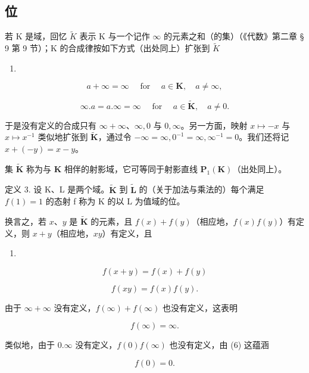 \subsection{位}

若 K 是域，回忆 \(\tilde{K}\) 表示 K 与一个记作 \(\infty\) 的元素之和（的集）（《代数》第二章 § 9 第 9 节）；K 的合成律按如下方式（出处同上）扩张到 \(\tilde{K}\)

\begin{enumerate}
\def\labelenumi{(\arabic{enumi})}
\setcounter{enumi}{1}
\tightlist
\item
\end{enumerate}

\[
a + \infty = \infty \quad \text { for } \quad a \in \mathbf {K}, \quad a \neq \infty ,\tag{2}
\]

\[
\infty . a = a. \infty = \infty \quad \text {   for   } \quad a \in \tilde {\mathbf {K}}, \quad a \neq 0.\tag{3}
\]

于是没有定义的合成只有 \(\infty + \infty\)、\(\infty, 0\) 与 \(0, \infty\)。另一方面，映射 \(x \mapsto -x\) 与 \(x \mapsto x^{-1}\) 类似地扩张到 \(\tilde{\mathbf{K}}\)，通过令 \(-\infty = \infty, 0^{-1} = \infty, \infty^{-1} = 0\)。我们还将记 \(x + (-y) = x - y\)。

集 \(\tilde{\mathbf{K}}\) 称为与 \(\mathbf{K}\) 相伴的射影域，它可等同于射影直线 \(\mathbf{P}_1(\mathbf{K})\)（出处同上）。

定义 3. 设 K、L 是两个域。\(\tilde{\mathbf{K}}\) 到 \(\tilde{\mathbf{L}}\) 的（关于加法与乘法的）每个满足 \(f(1) = 1\) 的态射 f 称为 K 的以 L 为值域的位。

换言之，若 \(x\)、\(y\) 是 \(\tilde{\mathbf{K}}\) 的元素，且 \(f(x) + f(y)\)（相应地，\(f(x)f(y)\)）有定义，则 \(x + y\)（相应地，\(xy\)）有定义，且

\begin{enumerate}
\def\labelenumi{(\arabic{enumi})}
\setcounter{enumi}{3}
\tightlist
\item
\end{enumerate}

\[
f (x + y) = f (x) + f (y)\tag{4}
\]

\[
f (x y) = f (x) f (y).\tag{5}
\]

由于 \(\infty +\infty\) 没有定义，\(f(\infty) + f(\infty)\) 也没有定义，这表明

\[
f (\infty) = \infty .\tag{6}
\]

类似地，由于 \(0.\infty\) 没有定义，\(f(0)f(\infty)\) 也没有定义，由 (6) 这蕴涵

\[
f (0) = 0.\tag{7}
\]

